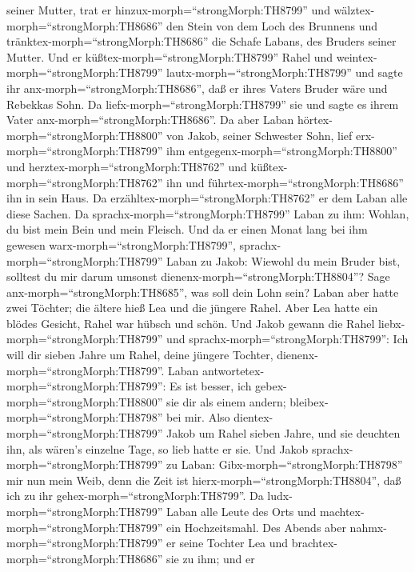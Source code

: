 seiner Mutter, trat er hinzux-morph=``strongMorph:TH8799'' und
wälztex-morph=``strongMorph:TH8686'' den Stein von dem Loch des Brunnens
und tränktex-morph=``strongMorph:TH8686'' die Schafe Labans, des Bruders
seiner Mutter.  Und er küßtex-morph=``strongMorph:TH8799''
Rahel und weintex-morph=``strongMorph:TH8799''
lautx-morph=``strongMorph:TH8799''  und sagte ihr
anx-morph=``strongMorph:TH8686'', daß er ihres Vaters Bruder wäre und
Rebekkas Sohn. Da liefx-morph=``strongMorph:TH8799'' sie und sagte es
ihrem Vater anx-morph=``strongMorph:TH8686''.  Da aber
Laban hörtex-morph=``strongMorph:TH8800'' von Jakob, seiner Schwester
Sohn, lief erx-morph=``strongMorph:TH8799'' ihm
entgegenx-morph=``strongMorph:TH8800'' und
herztex-morph=``strongMorph:TH8762'' und
küßtex-morph=``strongMorph:TH8762'' ihn und
führtex-morph=``strongMorph:TH8686'' ihn in sein Haus. Da
erzähltex-morph=``strongMorph:TH8762'' er dem Laban alle diese Sachen.
 Da sprachx-morph=``strongMorph:TH8799'' Laban zu ihm:
Wohlan, du bist mein Bein und mein Fleisch. Und da er einen Monat lang
bei ihm gewesen warx-morph=``strongMorph:TH8799'', 
sprachx-morph=``strongMorph:TH8799'' Laban zu Jakob: Wiewohl du mein
Bruder bist, solltest du mir darum umsonst
dienenx-morph=``strongMorph:TH8804''? Sage
anx-morph=``strongMorph:TH8685'', was soll dein Lohn sein? 
Laban aber hatte zwei Töchter; die ältere hieß Lea und die jüngere
Rahel.  Aber Lea hatte ein blödes Gesicht, Rahel war hübsch
und schön.  Und Jakob gewann die Rahel
liebx-morph=``strongMorph:TH8799'' und
sprachx-morph=``strongMorph:TH8799'': Ich will dir sieben Jahre um
Rahel, deine jüngere Tochter, dienenx-morph=``strongMorph:TH8799''.
 Laban antwortetex-morph=``strongMorph:TH8799'': Es ist
besser, ich gebex-morph=``strongMorph:TH8800'' sie dir als einem andern;
bleibex-morph=``strongMorph:TH8798'' bei mir.  Also
dientex-morph=``strongMorph:TH8799'' Jakob um Rahel sieben Jahre, und
sie deuchten ihn, als wären's einzelne Tage, so lieb hatte er sie.
 Und Jakob sprachx-morph=``strongMorph:TH8799'' zu Laban:
Gibx-morph=``strongMorph:TH8798'' mir nun mein Weib, denn die Zeit ist
hierx-morph=``strongMorph:TH8804'', daß ich zu ihr
gehex-morph=``strongMorph:TH8799''.  Da
ludx-morph=``strongMorph:TH8799'' Laban alle Leute des Orts und
machtex-morph=``strongMorph:TH8799'' ein Hochzeitsmahl. 
Des Abends aber nahmx-morph=``strongMorph:TH8799'' er seine Tochter Lea
und brachtex-morph=``strongMorph:TH8686'' sie zu ihm; und er
